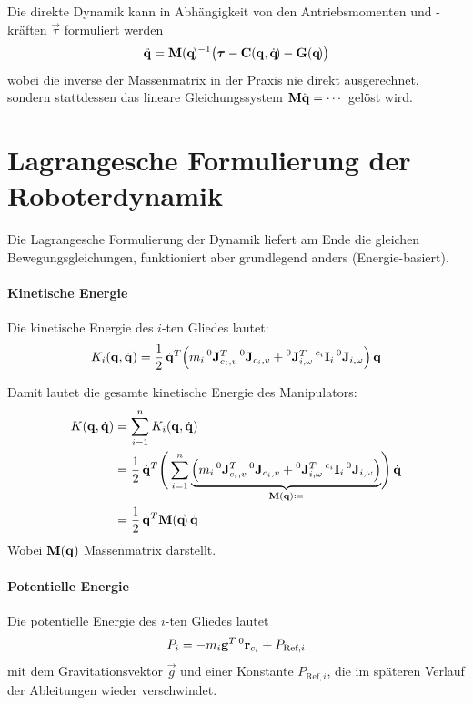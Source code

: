 			Die direkte Dynamik \DIRDYN kann in Abhängigkeit von den Antriebsmomenten und -kräften \(\vec{\tau}\) formuliert werden
			\begin{equation*}
				\ddot{\boldsymbol{\mathrm{q}}} = \boldsymbol{\mathrm{M}}(\boldsymbol{\mathrm{q}}\!)^{-1} \big( \boldsymbol{\mathrm{\tau}} - \boldsymbol{\mathrm{C}}(\boldsymbol{\mathrm{q}}, \dot{\boldsymbol{\mathrm{q}}}\!) - \boldsymbol{\mathrm{G}}(\boldsymbol{\mathrm{q}}\!) \big)
			\end{equation*}
			wobei die inverse der Massenmatrix in der Praxis nie direkt ausgerechnet, sondern stattdessen das lineare Gleichungssystem \( \boldsymbol{\mathrm{M}} \ddot{\boldsymbol{\mathrm{q}}} = \cdots \) gelöst wird.

	\section{Lagrangesche Formulierung der Roboterdynamik}
		Die Lagrangesche Formulierung der Dynamik liefert am Ende die gleichen Bewegungsgleichungen, funktioniert aber grundlegend anders (Energie-basiert).
		
		\paragraph{Kinetische Energie}
			Die kinetische Energie des \(i\)-ten Gliedes lautet:
			\begin{equation*}
				K_i(\boldsymbol{\mathrm{q}}, \dot{\boldsymbol{\mathrm{q}}}) = \frac{1}{2}\, \dot{\boldsymbol{\mathrm{q}}}^T \Big( m_i \prescript{0}{}{\boldsymbol{\mathrm{J}}}_{c_i, v}^T \prescript{0}{}{\boldsymbol{\mathrm{J}}}_{c_i, v} + \prescript{0}{}{\boldsymbol{\mathrm{J}}}_{i, \omega}^T \prescript{c_i}{}{\boldsymbol{\mathrm{I}}}_i \prescript{0}{}{\boldsymbol{\mathrm{J}}}_{i, \omega} \Big)\, \dot{\boldsymbol{\mathrm{q}}}
			\end{equation*}
			
			Damit lautet die gesamte kinetische Energie des Manipulators:
			\begin{align*}
				K(\boldsymbol{\mathrm{q}}, \dot{\boldsymbol{\mathrm{q}}}) &= \sum_{i = 1}^{n} K_i(\boldsymbol{\mathrm{q}}, \dot{\boldsymbol{\mathrm{q}}}) \\
					&= \frac{1}{2} \, \dot{\boldsymbol{\mathrm{q}}}^T \Bigg( \sum_{i = 1}^{n} \underbrace{\Big( m_i \prescript{0}{}{\boldsymbol{\mathrm{J}}}_{c_i, v}^T \prescript{0}{}{\boldsymbol{\mathrm{J}}}_{c_i, v} + \prescript{0}{}{\boldsymbol{\mathrm{J}}}_{i, \omega}^T \prescript{c_i}{}{\boldsymbol{\mathrm{I}}}_i \prescript{0}{}{\boldsymbol{\mathrm{J}}}_{i, \omega} \Big)}_{\boldsymbol{\mathrm{M}}(\boldsymbol{\mathrm{q}}) \coloneqq} \! \Bigg)\, \dot{\boldsymbol{\mathrm{q}}} \\
					&= \frac{1}{2} \, \dot{\boldsymbol{\mathrm{q}}}^T \boldsymbol{\mathrm{M}}(\boldsymbol{\mathrm{q}}\!)\, \dot{\boldsymbol{\mathrm{q}}}
			\end{align*}
			Wobei \( \boldsymbol{\mathrm{M}}(\boldsymbol{\mathrm{q}}) \) Massenmatrix darstellt.
		
		\paragraph{Potentielle Energie}
			Die potentielle Energie des \(i\)-ten Gliedes lautet
			\begin{equation*}
				P_i = -m_i \boldsymbol{\mathrm{g}}^T \prescript{0}{}{\boldsymbol{\mathrm{r}}}_{c_i} + P_{\text{Ref}, i}
			\end{equation*}
			mit dem Gravitationsvektor \( \vec{g} \) und einer Konstante \( P_{\text{Ref}, i} \), die im späteren Verlauf der Ableitungen wieder verschwindet.
			
